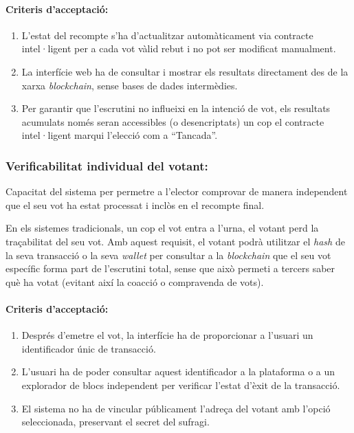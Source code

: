 \paragraph{Criteris d'acceptació:}
\begin{enumerate}[label=\roman*.]
    \item L'estat del recompte s'ha d'actualitzar automàticament via contracte intel·ligent per a cada vot vàlid rebut i no pot ser modificat manualment.
    \item La interfície web ha de consultar i mostrar els resultats directament des de la xarxa \textit{blockchain}, sense bases de dades intermèdies.
    \item Per garantir que l'escrutini no influeixi en la intenció de vot, els resultats acumulats només seran accessibles (o desencriptats) un cop el contracte intel·ligent marqui l'elecció com a ``Tancada''.
\end{enumerate}

\subsubsection{Verificabilitat individual del votant:}
Capacitat del sistema per permetre a l'elector comprovar de manera independent que el seu vot ha estat processat i inclòs en el recompte final.

En els sistemes tradicionals, un cop el vot entra a l'urna, el votant perd la traçabilitat del seu vot. 
Amb aquest requisit, el votant podrà utilitzar el \textit{hash} de la seva transacció o la seva \textit{wallet} per consultar a la \textit{blockchain} que el seu vot específic forma part de l'escrutini total, sense que això permeti a tercers saber què ha votat (evitant així la coacció o compravenda de vots).

\paragraph{Criteris d'acceptació:}
\begin{enumerate}[label=\roman*.]
    \item Després d'emetre el vot, la interfície ha de proporcionar a l'usuari un identificador únic de transacció.
    \item L'usuari ha de poder consultar aquest identificador a la plataforma o a un explorador de blocs independent per verificar l'estat d'èxit de la transacció.
    \item El sistema no ha de vincular públicament l'adreça del votant amb l'opció seleccionada, preservant el secret del sufragi.
\end{enumerate}

